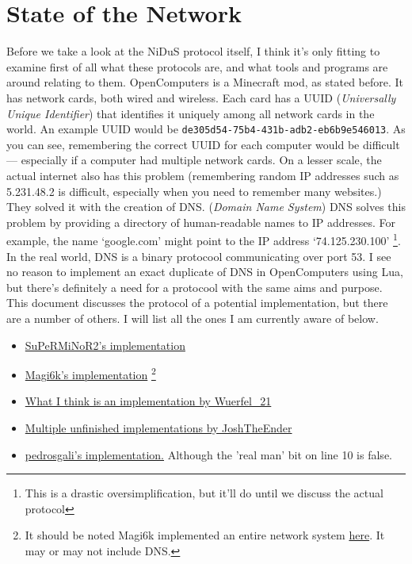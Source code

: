 \documentclass[]{report}
\begin{document}
\chapter{State of the Network}
Before we take a look at the NiDuS protocol itself, I think it's only fitting to examine first of all what these protocols are, and what tools and programs are around relating to them.
OpenComputers is a Minecraft mod, as stated before. It has network cards, both wired and wireless. Each card has a UUID (\textit{Universally Unique Identifier}) that identifies it uniquely among all network cards in the world. An example UUID would be \texttt{de305d54-75b4-431b-adb2-eb6b9e546013}. As you can see, remembering the correct UUID for each computer would be difficult --- especially if a computer had multiple network cards. On a lesser scale, the actual internet also has this problem (remembering random IP addresses such as 5.231.48.2 is difficult, especially when you need to remember many websites.) They solved it with the creation of DNS. (\textit{Domain Name System}) DNS solves this problem by providing a directory of human-readable names to IP addresses. For example, the name `google.com' might point to the IP address `74.125.230.100' \footnote{This is a drastic oversimplification, but it'll do until we discuss the actual protocol}. In the real world, DNS is a binary protocool communicating over port 53. I see no reason to implement an exact duplicate of DNS in OpenComputers using Lua, but there's definitely a need for a protocool with the same aims and purpose. This document discusses the protocol of a potential implementation, but there are a number of others. I will list all the ones I am currently aware of below.
\begin{itemize}
	\item \href{https://github.com/OpenPrograms/SuPeRMiNoR2-Programs/blob/master/networking/dns.lua}{SuPeRMiNoR2's implementation}
	\item
	\href{http://oc.cil.li/index.php?/topic/215-dns-system/}{Magi6k's implementation} \footnote{It should be noted Magi6k implemented an entire network system \href{https://github.com/OpenPrograms/Magik6k-Programs/tree/master/network}{here}. It may or may not include DNS.}
	\item
	\href{https://github.com/OpenPrograms/Wuerfel_21-OC-Toolkit/tree/master/snl}{What I think is an implementation by Wuerfel\_21}
	\item
	\href{https://github.com/OpenPrograms/JoshTheEnder-Programs}{Multiple unfinished implementations by JoshTheEnder}
	\item
	\href{http://pastebin.com/pxFY89UZ}{pedrosgali's implementation.} Although the 'real man' bit on line 10 is false.
\end{itemize}
\appendix
\end{document}
